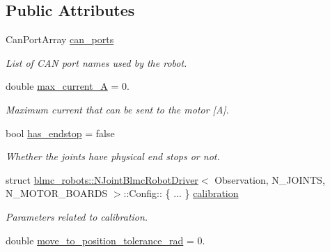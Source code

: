\subsection*{Public Attributes}
\begin{DoxyCompactItemize}
\item 
Can\+Port\+Array \hyperlink{structblmc__robots_1_1NJointBlmcRobotDriver_1_1Config_a4e59e7c7ac5daba34f83eb8f1456a103}{can\+\_\+ports}
\begin{DoxyCompactList}\small\item\em List of C\+AN port names used by the robot. \end{DoxyCompactList}\item 
\mbox{\label{structblmc__robots_1_1NJointBlmcRobotDriver_1_1Config_a553c5cb5a9da1f0c5e5f9e4c2e19c286}} 
double \hyperlink{structblmc__robots_1_1NJointBlmcRobotDriver_1_1Config_a553c5cb5a9da1f0c5e5f9e4c2e19c286}{max\+\_\+current\+\_\+A} = 0.
\begin{DoxyCompactList}\small\item\em Maximum current that can be sent to the motor \mbox{[}A\mbox{]}. \end{DoxyCompactList}\item 
bool \hyperlink{structblmc__robots_1_1NJointBlmcRobotDriver_1_1Config_a8fb4f2f8ae75bf1555cd6c3ea5272541}{has\+\_\+endstop} = false
\begin{DoxyCompactList}\small\item\em Whether the joints have physical end stops or not. \end{DoxyCompactList}\item 
\mbox{\label{structblmc__robots_1_1NJointBlmcRobotDriver_1_1Config_a0b9d29b12a079f51909c6d68eaa5ce0a}} 
struct \hyperlink{classblmc__robots_1_1NJointBlmcRobotDriver}{blmc\+\_\+robots\+::\+N\+Joint\+Blmc\+Robot\+Driver}$<$ Observation, N\+\_\+\+J\+O\+I\+N\+TS, N\+\_\+\+M\+O\+T\+O\+R\+\_\+\+B\+O\+A\+R\+DS $>$\+::Config\+:: \{ ... \}  \hyperlink{structblmc__robots_1_1NJointBlmcRobotDriver_1_1Config_a0b9d29b12a079f51909c6d68eaa5ce0a}{calibration}
\begin{DoxyCompactList}\small\item\em Parameters related to calibration. \end{DoxyCompactList}\item 
double \hyperlink{structblmc__robots_1_1NJointBlmcRobotDriver_1_1Config_ab4093c960a915b4ee5fdfde0684e3969}{move\+\_\+to\+\_\+position\+\_\+tolerance\+\_\+rad} = 0.

\end{DoxyCompactItemize}
